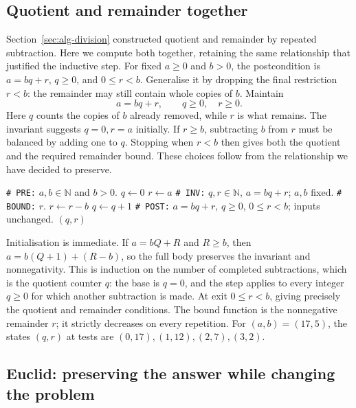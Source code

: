\subsection{Quotient and remainder together}

Section~\ref{sec:alg-division} constructed quotient and remainder by
repeated subtraction. Here we compute both together, retaining the same
relationship that justified the inductive step. For fixed $a\geq0$ and
$b>0$, the postcondition is $a=bq+r$, $q\geq0$, and $0\leq r<b$.
Generalise it by dropping the final restriction $r<b$: the remainder may
still contain whole copies of $b$. Maintain
\[
a=bq+r,\qquad q\geq0,\quad r\geq0.
\]
Here $q$ counts the copies of $b$ already removed, while $r$ is what remains.
The invariant suggests $q=0,r=a$ initially. If $r\geq b$, subtracting
$b$ from $r$ must be balanced by adding one to $q$. Stopping when $r<b$
then gives both the quotient and the required remainder bound. These
choices follow from the relationship we have decided to preserve.

\begin{algorithm}[H]
\begin{algorithmic}[1]
\Statex \texttt{\# PRE:} $a,b\in\mathbb N$ and $b>0$.
\State $q\leftarrow0$
\State $r\leftarrow a$
\Statex \texttt{\# INV:} $q,r\in\mathbb N$, $a=bq+r$; $a,b$ fixed.
\Statex \texttt{\# BOUND:} $r$.
\State $r\leftarrow r-b$
\State $q\leftarrow q+1$
\EndWhile
\Statex \texttt{\# POST:} $a=bq+r$, $q\geq0$, $0\leq r<b$; inputs unchanged.
\State \Return $(q,r)$
\EndProcedure
\end{algorithmic}
\caption{Each repetition removes one more copy of the divisor.}
\end{algorithm}

Initialisation is immediate. If $a=bQ+R$ and $R\geq b$, then
$a=b(Q+1)+(R-b)$, so the full body preserves the invariant and nonnegativity.
This is induction on the number of completed subtractions, which is the
quotient counter $q$: the base is $q=0$, and the step applies to every
integer $q\geq0$ for which another subtraction is made.
At exit $0\leq r<b$, giving precisely the quotient and remainder conditions.
The bound function is the nonnegative remainder $r$; it strictly decreases on every repetition.
For $(a,b)=(17,5)$, the states $(q,r)$ at tests are
$(0,17),(1,12),(2,7),(3,2)$.

\subsection{Euclid: preserving the answer while changing the problem}

